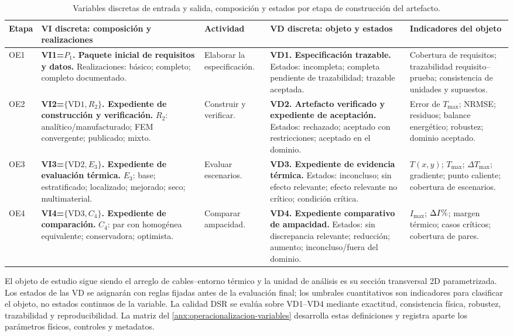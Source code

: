 \documentclass[11pt,a4paper,oneside]{report}
\renewcommand{\arraystretch}{1.18}
\newcommand{\Tmax}{T_{\max}}
\newcommand{\Imax}{I_{\max}}
\newcommand{\pct}{\mbox{\char37}}
\begin{document}
\begin{table}[H]
\centering
\caption{Variables discretas de entrada y salida, composición y estados por etapa de construcción del artefacto.}
\label{tab:dimensiones-operativas}
\begingroup
\scriptsize
\setlength{\tabcolsep}{3pt}
\renewcommand{\arraystretch}{1.42}
\begin{tabularx}{\textwidth}{L{1.10cm}L{4.25cm}L{2.15cm}L{4.25cm}Y}
\toprule
\textbf{Etapa} & \textbf{VI discreta: composición y realizaciones} & \textbf{Actividad} & \textbf{VD discreta: objeto y estados} & \textbf{Indicadores del objeto} \\
\midrule
OE1 & \textbf{VI1=$P_1$. Paquete inicial de requisitos y datos.} Realizaciones: básico; completo; completo documentado. & Elaborar la especificación. & \textbf{VD1. Especificación trazable.} Estados: incompleta; completa pendiente de trazabilidad; trazable aceptada. & Cobertura de requisitos; trazabilidad requisito--prueba; consistencia de unidades y supuestos. \\
OE2 & \textbf{VI2=$\{\mathrm{VD1},R_2\}$. Expediente de construcción y verificación.} $R_2$: analítico/manufacturado; FEM convergente; publicado; mixto. & Construir y verificar. & \textbf{VD2. Artefacto verificado y expediente de aceptación.} Estados: rechazado; aceptado con restricciones; aceptado en el dominio. & Error de $\Tmax$; NRMSE; residuos; balance energético; robustez; dominio aceptado. \\
OE3 & \textbf{VI3=$\{\mathrm{VD2},E_3\}$. Expediente de evaluación térmica.} $E_3$: base; estratificado; localizado; mejorado; seco; multimaterial. & Evaluar escenarios. & \textbf{VD3. Expediente de evidencia térmica.} Estados: inconcluso; sin efecto relevante; efecto relevante no crítico; condición crítica. & $T(x,y)$; $\Tmax$; $\Delta\Tmax$; gradiente; punto caliente; cobertura de escenarios. \\
OE4 & \textbf{VI4=$\{\mathrm{VD3},C_4\}$. Expediente de comparación.} $C_4$: par con homogénea equivalente; conservadora; optimista. & Comparar ampacidad. & \textbf{VD4. Expediente comparativo de ampacidad.} Estados: sin discrepancia relevante; reducción; aumento; inconcluso/fuera del dominio. & $\Imax$; $\Delta I\pct$; margen térmico; casos críticos; cobertura de pares. \\
\bottomrule
\end{tabularx}
\endgroup
\end{table}

El objeto de estudio sigue siendo el arreglo de cables--entorno térmico y la unidad de análisis es su sección transversal 2D parametrizada. Los estados de las VD se asignarán con reglas fijadas antes de la evaluación final; los umbrales cuantitativos son indicadores para clasificar el objeto, no estados continuos de la variable. La calidad DSR se evalúa sobre VD1--VD4 mediante exactitud, consistencia física, robustez, trazabilidad y reproducibilidad. La matriz del \ref{anx:operacionalizacion-variables} desarrolla estas definiciones y registra aparte los parámetros físicos, controles y metadatos.
\end{document}
